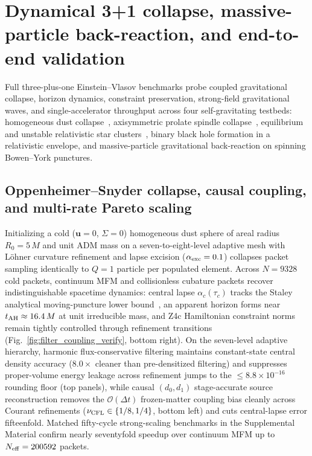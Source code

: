 \section{Dynamical 3+1 collapse, massive-particle back-reaction, and end-to-end validation}\label{sec:collapse}

Full three-plus-one Einstein--Vlasov benchmarks probe coupled gravitational collapse, horizon dynamics, constraint preservation, strong-field gravitational waves, and single-accelerator throughput across four self-gravitating testbeds: homogeneous dust collapse~\cite{Oppenheimer:1939ue,Staley:2011ss,Wu:2026nrpic}, axisymmetric prolate spindle collapse~\cite{Shapiro:1991zza,Yoo:2016kzu}, equilibrium and unstable relativistic star clusters~\cite{1985ApJ...298...34S,1985ApJ...298...58S}, binary black hole formation in a relativistic envelope, and massive-particle gravitational back-reaction on spinning Bowen--York punctures.

\subsection{Oppenheimer--Snyder collapse, causal coupling, and multi-rate Pareto scaling}\label{sec:collapse_os}

Initializing a cold ($\bm{u} = 0$, $\Sigma = 0$) homogeneous dust sphere of areal radius $R_0 = 5\,M$ and unit ADM mass on a seven-to-eight-level adaptive mesh with L\"ohner curvature refinement and lapse excision ($\alpha_{\rm exc} = 0.1$) collapses packet sampling identically to $Q = 1$ particle per populated element. Across $N = 9328$ cold packets, continuum MFM and collisionless cubature packets recover indistinguishable spacetime dynamics: central lapse $\alpha_c(\tau_c)$ tracks the Staley analytical moving-puncture lower bound~\cite{Staley:2011ss}, an apparent horizon forms near $t_{\rm AH} \approx 16.4\,M$ at unit irreducible mass, and Z4c Hamiltonian constraint norms remain tightly controlled through refinement transitions (Fig.~\ref{fig:filter_coupling_verify}, bottom right). On the seven-level adaptive hierarchy, harmonic flux-conservative filtering maintains constant-state central density accuracy ($8.0\times$ cleaner than pre-densitized filtering) and suppresses proper-volume energy leakage across refinement jumps to the $\le 8.8\times 10^{-16}$ rounding floor (top panels), while causal $(d_0, d_1)$ stage-accurate source reconstruction removes the $\mathcal{O}(\Delta t)$ frozen-matter coupling bias cleanly across Courant refinements ($\nu_{\rm CFL} \in \{1/8, 1/4\}$, bottom left) and cuts central-lapse error fifteenfold. Matched fifty-cycle strong-scaling benchmarks in the Supplemental Material confirm nearly seventyfold speedup over continuum MFM up to $N_{\rm eff} = 200592$ packets.

